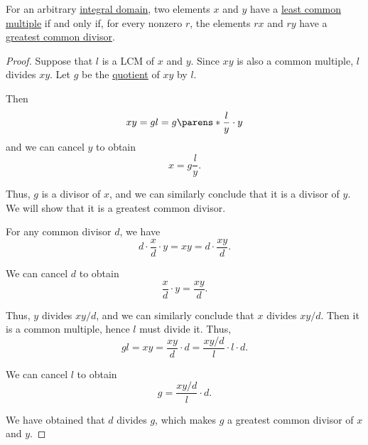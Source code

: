 \begin{proposition}\label{thm:gcd_and_lcm_existence}
  For an arbitrary \hyperref[def:integral_domain]{integral domain}, two elements \( x \) and \( y \) have a \hyperref[def:lcm]{least common multiple} if and only if, for every nonzero \( r \), the elements \( rx \) and \( ry \) have a \hyperref[def:gcd]{greatest common divisor}.
\end{proposition}
\begin{proof}
  \SufficiencySubProof

   Suppose that \( l \) is a LCM of \( x \) and \( y \). Since \( xy \) is also a common multiple, \( l \) divides \( xy \). Let \( g \) be the \hyperref[def:domain_quotient]{quotient} of \( xy \) by \( l \).

  Then
  \begin{equation*}
    xy = gl = g \parens*{ \frac l y \cdot y}
  \end{equation*}
  and we can cancel \( y \) to obtain
  \begin{equation*}
    x = g \frac l y.
  \end{equation*}

  Thus, \( g \) is a divisor of \( x \), and we can similarly conclude that it is a divisor of \( y \). We will show that it is a greatest common divisor.

  For any common divisor \( d \), we have
  \begin{equation*}
    d \cdot \frac x d \cdot y
    =
    xy
    =
    d \cdot \frac {xy} d.
  \end{equation*}

  We can cancel \( d \) to obtain
  \begin{equation*}
    \frac x d \cdot y = \frac {xy} d.
  \end{equation*}

  Thus, \( y \) divides \( xy / d \), and we can similarly conclude that \( x \) divides \( xy / d \). Then it is a common multiple, hence \( l \) must divide it. Thus,
  \begin{equation*}
    gl = xy = \frac {xy} d \cdot d = \frac {xy / d} l \cdot l \cdot d.
  \end{equation*}

  We can cancel \( l \) to obtain
  \begin{equation*}
    g = \frac {xy / d} l \cdot d.
  \end{equation*}

  We have obtained that \( d \) divides \( g \), which makes \( g \) a greatest common divisor of \( x \) and \( y \).


\end{proof}
